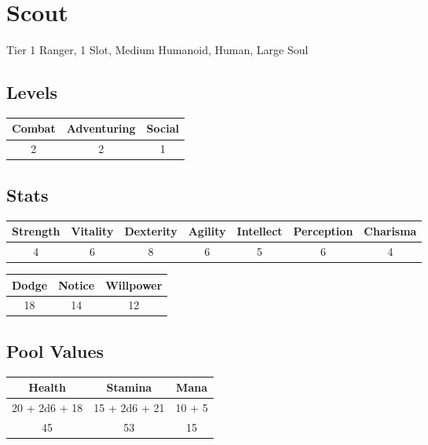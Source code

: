\section{Scout}
Tier 1 Ranger, 1 Slot, Medium Humanoid, Human, Large Soul\\

\subsection{Levels}
\begin{minipage}[H]{1\textwidth}
	\centering
	\begin{tabular}[c]{|c | c | c|}
		\hline
		Combat & Adventuring & Social\\
		\hline
		2 & 2 & 1\\
		\hline
	\end{tabular}
\end{minipage}

\subsection{Stats}
\begin{minipage}[H]{1\textwidth}
	\centering
	\begin{tabular}[c]{|c | c | c | c | c | c | c|}
		\hline
		Strength & Vitality & Dexterity & Agility & Intellect & Perception & Charisma\\
		\hline
		4 & 6 & 8 & 6 & 5 & 6 & 4\\
		\hline
	\end{tabular}
\end{minipage}
\bigbreak

\begin{minipage}[H]{1\textwidth}
	\centering
	\begin{tabular}[c]{|c | c | c|}
		\hline
		Dodge & Notice & Willpower\\
		\hline
		18 & 14 & 12\\
		\hline
	\end{tabular}
\end{minipage}

\subsection{Pool Values}
\bigbreak
\begin{minipage}[H]{1\textwidth}
	\centering
	\begin{tabular}[c]{|c | c | c|}
		\hline
		Health & Stamina & Mana\\
		\hline
		20 + 2d6 + 18 & 15 + 2d6 + 21 & 10 + 5 \\
		45 & 53 & 15\\
		\hline
	\end{tabular}
\end{minipage}
\noindent

